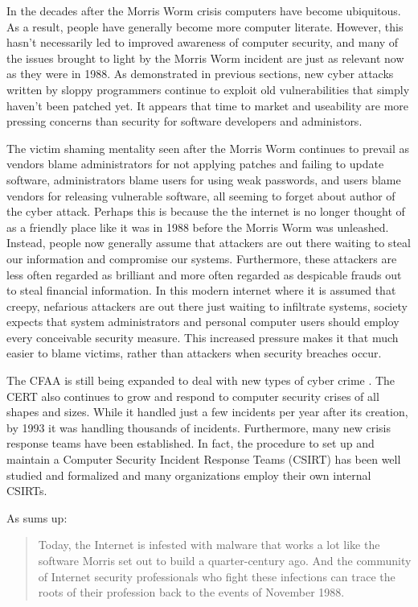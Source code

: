 In the decades after the Morris Worm crisis computers have become ubiquitous.
As a result, people have generally become more computer literate. However, this hasn't
necessarily led to improved awareness of computer security, and many of the
issues brought to light by the Morris Worm incident are just as relevant now as
they were in 1988. As demonstrated in previous sections, new cyber attacks
written by sloppy programmers continue to exploit old vulnerabilities that
simply haven't been patched yet. It appears that time to market and useability
are more pressing concerns than security for software developers and
administors. 

The victim shaming mentality seen after the Morris Worm continues
to prevail as vendors blame administrators for not applying patches and failing
to update software, administrators blame users for using weak passwords, and
users blame vendors for releasing vulnerable software, all seeming to forget
about author of the cyber attack. Perhaps this is because the the internet is
no longer thought of as a friendly place like it was in 1988 before the Morris
Worm was unleashed. Instead, people now generally assume that attackers are out
there waiting to steal our information and compromise our systems.
Furthermore, these attackers are less often regarded as brilliant and more often
regarded as despicable frauds out to steal financial information. In this modern
internet where it is assumed that creepy, nefarious attackers are out there just
waiting to infiltrate systems, society expects that system administrators and
personal computer users should employ every conceivable security measure. This
increased pressure makes it that much easier to blame victims, rather than
attackers when security breaches occur.

The CFAA is still being expanded to deal with new types of cyber crime
\cite{adams_controlling_1996}. The CERT also continues to grow and respond to
computer security crises of all shapes and sizes. While it handled just a few
incidents per year after its creation, by 1993 it was handling thousands of
incidents\cite{fithen_cert_1994}. Furthermore, many new crisis response teams
have been established. In fact, the procedure to set up and maintain a Computer
Security Incident Response Teams (CSIRT) has been well studied and formalized
and many organizations employ their own internal CSIRTs. 

As \cite{lee_washpost_2013} sums up:
\begin{quote}
Today, the Internet is infested with malware that works a lot like the software
Morris set out to build a quarter-century ago. And the community of Internet
security professionals who fight these infections can trace the roots of their
profession back to the events of November 1988.
\end{quote}
